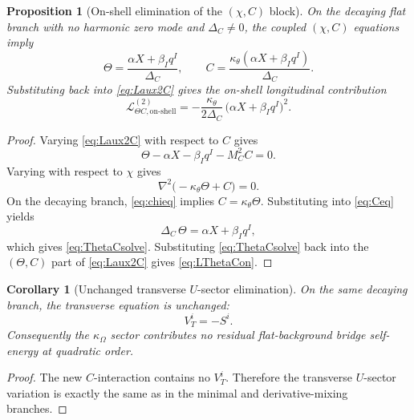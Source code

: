 \documentclass[11pt]{article}
\newtheorem{proposition}{Proposition}
\newtheorem{corollary}{Corollary}
\begin{document}
\begin{proposition}[On-shell elimination of the \((\chi,C)\) block]
On the decaying flat branch with no harmonic zero mode and \(\Delta_C\neq0\), the coupled \((\chi,C)\) equations imply
\begin{equation}
\Theta
=
\frac{\alpha X+\beta_Iq^I}{\Delta_C},
\qquad
C
=
\frac{\kappa_\theta(\alpha X+\beta_Iq^I)}{\Delta_C}.
\label{eq:ThetaCsolve}
\end{equation}
Substituting back into \eqref{eq:Laux2C} gives the on-shell longitudinal contribution
\begin{equation}
\mathcal L_{\Theta C,\mathrm{on\mbox{-}shell}}^{(2)}
=
-\frac{\kappa_\theta}{2\Delta_C}\,
\bigl(\alpha X+\beta_Iq^I\bigr)^2.
\label{eq:LThetaCon}
\end{equation}
\end{proposition}

\begin{proof}
Varying \eqref{eq:Laux2C} with respect to \(C\) gives
\begin{equation}
\Theta-\alpha X-\beta_Iq^I-M_C^2C=0.
\label{eq:Ceq}
\end{equation}
Varying with respect to \(\chi\) gives
\begin{equation}
\nabla^2\bigl(-\kappa_\theta\Theta+C\bigr)=0.
\label{eq:chieq}
\end{equation}
On the decaying branch, \eqref{eq:chieq} implies \(C=\kappa_\theta\Theta\). Substituting into \eqref{eq:Ceq} yields
\[
\Delta_C\,\Theta=\alpha X+\beta_Iq^I,
\]
which gives \eqref{eq:ThetaCsolve}. Substituting \eqref{eq:ThetaCsolve} back into the \((\Theta,C)\) part of \eqref{eq:Laux2C} gives \eqref{eq:LThetaCon}.
\end{proof}

\begin{corollary}[Unchanged transverse \(U\)-sector elimination]
On the same decaying branch, the transverse equation is unchanged:
\begin{equation}
V_T^i=-S^i.
\label{eq:VTsolve}
\end{equation}
Consequently the \(\kappa_\Omega\) sector contributes no residual flat-background bridge self-energy at quadratic order.
\end{corollary}

\begin{proof}
The new \(C\)-interaction contains no \(V_T^i\). Therefore the transverse \(U\)-sector variation is exactly the same as in the minimal and derivative-mixing branches.
\end{proof}
\end{document}
